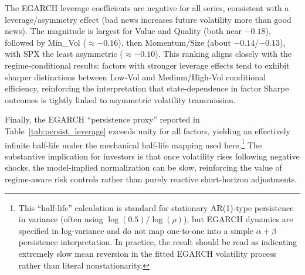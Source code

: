 \documentclass{article}
\begin{document}
The EGARCH leverage coefficients are negative for all series, consistent with a leverage/asymmetry effect (bad news increases future volatility more than good news). The magnitude is largest for Value and Quality (both near $-0.18$), followed by Min\_Vol ($\approx -0.16$), then Momentum/Size (about $-0.14$/$-0.13$), with SPX the least asymmetric ($\approx -0.10$). This ranking aligns closely with the regime-conditional results: factors with stronger leverage effects tend to exhibit sharper distinctions between Low-Vol and Medium/High-Vol conditional efficiency, reinforcing the interpretation that state-dependence in factor Sharpe outcomes is tightly linked to asymmetric volatility transmission.\newline

Finally, the EGARCH ``persistence proxy'' reported in Table~\ref{tab:persist_leverage} exceeds unity for all factors, yielding an effectively infinite half-life under the mechanical half-life mapping used here.\footnote{This ``half-life'' calculation is standard for stationary AR(1)-type persistence in variance (often using $\log(0.5)/\log(\rho)$), but EGARCH dynamics are specified in log-variance and do not map one-to-one into a simple $\alpha+\beta$ persistence interpretation. In practice, the result should be read as indicating extremely slow mean reversion in the fitted EGARCH volatility process rather than literal nonstationarity.} The substantive implication for investors is that once volatility rises following negative shocks, the model-implied normalization can be slow, reinforcing the value of regime-aware risk controls rather than purely reactive short-horizon adjustments.\newline
\end{document}

